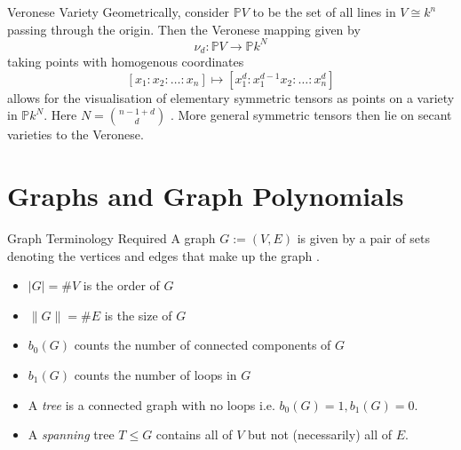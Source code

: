\documentclass{beamer}
\def\proj{\mathbb{P}} %
\begin{document}
\begin{frame}{Veronese Variety}
    Geometrically, consider $\proj V$ to be the set of all lines in $V \cong k^n$ passing through the origin. Then the Veronese mapping given by $$\nu_d: \proj V \to \proj k^N$$ taking points with homogenous coordinates $$[x_1:x_2:\ldots:x_n] \mapsto [x_1^d: x_1^{d-1}x_2: \ldots: x_n^d]$$ allows for the visualisation of elementary symmetric tensors as points on a variety in $\proj k^N$. Here $N = \binom{n-1+d}{d}$ \cite{smith_invitation_2004}. More general symmetric tensors then lie on secant varieties to the Veronese.
\end{frame}
\section{Graphs and Graph Polynomials} %
\begin{frame}{Graph Terminology Required}
    A graph $G:= (V,E)$ is given by a pair of sets denoting the vertices and edges that make up the graph \cite{diestel_graph_2017}. \begin{itemize}
        \item<1-> $|G| = \# V$ is the order of $G$
        \item<2-> $\| G \|= \# E$ is the size of $G$
        \item<3-> $b_0(G)$ counts the number of connected components of $G$ \cite{belkale_matroids_2003}
        \item<4-> $b_1(G)$ counts the number of loops in $G$ \cite{belkale_matroids_2003}
        \item<5-> A \textit{tree} is a connected graph with no loops i.e. $b_0(G) = 1, b_1(G) = 0$.
        \item<6-> A \textit{spanning} tree $T \leq G$ contains all of $V$ but not (necessarily) all of $E$.
    \end{itemize}
\end{frame}
\end{document}
